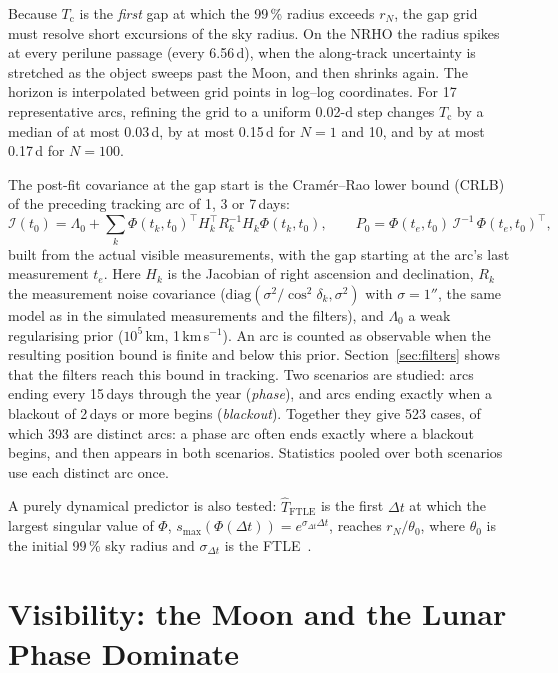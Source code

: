 \documentclass[pdflatex,sn-mathphys-num]{sn-jnl}
\newcommand{\Tc}{T_{\mathrm{c}}}
\begin{document}
Because $\Tc$ is the \emph{first} gap at which the 99\,\% radius exceeds $r_N$, the gap grid must
resolve short excursions of the sky radius. On the NRHO the radius spikes at every perilune
passage (every 6.56\,d), when the along-track uncertainty is stretched as the object sweeps past
the Moon, and then shrinks again. The horizon is interpolated between grid points in log--log
coordinates. For 17 representative arcs, refining the grid to a uniform 0.02-d step changes $\Tc$ by a median of at
most 0.03\,d, by at most 0.15\,d for $N = 1$ and 10, and by at most 0.17\,d for $N = 100$.

The post-fit covariance at the gap start is the Cram\'er--Rao lower bound (CRLB) of the preceding
tracking arc of 1, 3 or 7\,days:
\begin{equation}
\mathcal I(t_0) = \Lambda_0 + \sum_k \Phi(t_k,t_0)^\top H_k^\top R_k^{-1} H_k \Phi(t_k,t_0),\qquad
P_0 = \Phi(t_e,t_0)\,\mathcal I^{-1}\,\Phi(t_e,t_0)^\top ,
\end{equation}
built from the actual visible measurements, with the gap starting at the arc's last measurement
$t_e$. Here $H_k$ is the Jacobian of right ascension and declination, $R_k$ the measurement noise
covariance ($\mathrm{diag}(\sigma^2/\cos^2\delta_k, \sigma^2)$ with $\sigma = 1''$, the same model as in the
simulated measurements and the filters), and $\Lambda_0$ a weak regularising prior ($10^5$\,km, 1\,km\,s$^{-1}$). An arc is
counted as observable when the resulting position bound is finite and below this prior.
Section~\ref{sec:filters} shows that the filters reach this bound in tracking. Two scenarios are
studied: arcs ending every 15\,days through the year (\emph{phase}), and arcs ending exactly when a
blackout of 2\,days or more begins (\emph{blackout}). Together they give 523 cases, of which 393 are
distinct arcs: a phase arc often ends exactly where a blackout begins, and then appears in both
scenarios. Statistics pooled over both scenarios use each distinct arc once.

A purely dynamical predictor is also tested: $\hat T_{\mathrm{FTLE}}$ is the first $\Delta t$ at
which the largest singular value of $\Phi$, $s_{\max}(\Phi(\Delta t)) = e^{\sigma_{\Delta t}\Delta t}$,
reaches $r_N/\theta_0$, where $\theta_0$ is the initial 99\,\% sky radius and $\sigma_{\Delta t}$ is
the FTLE~\cite{shadden2005}.

\section{Visibility: the Moon and the Lunar Phase Dominate}\label{sec:vis}
\end{document}
